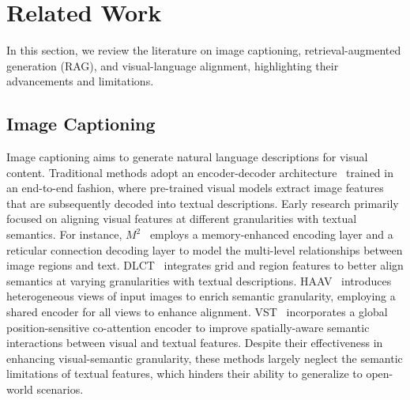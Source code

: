 \section{Related Work}
In this section, we review the literature on image captioning, retrieval-augmented generation (RAG), and visual-language alignment, highlighting their advancements and limitations.

\subsection{Image Captioning} 
Image captioning aims to generate natural language descriptions for visual content. Traditional methods adopt an encoder-decoder architecture~\cite{vinyals2015show, wu2019recall, xu2019multi} trained in an end-to-end fashion, where pre-trained visual models extract image features that are subsequently decoded into textual descriptions. Early research primarily focused on aligning visual features at different granularities with textual semantics. For instance, $M^{2}$~\cite{cornia2020meshed} employs a memory-enhanced encoding layer and a reticular connection decoding layer to model the multi-level relationships between image regions and text. DLCT~\cite{luo2021dual} integrates grid and region features to better align semantics at varying granularities with textual descriptions. HAAV~\cite{kuo2023haav} introduces heterogeneous views of input images to enrich semantic granularity, employing a shared encoder for all views to enhance alignment. VST~\cite{zhang2023improving} incorporates a global position-sensitive co-attention encoder to improve spatially-aware semantic interactions between visual and textual features.
Despite their effectiveness in enhancing visual-semantic granularity, these methods largely neglect the semantic limitations of textual features, which hinders their ability to generalize to open-world scenarios. 

